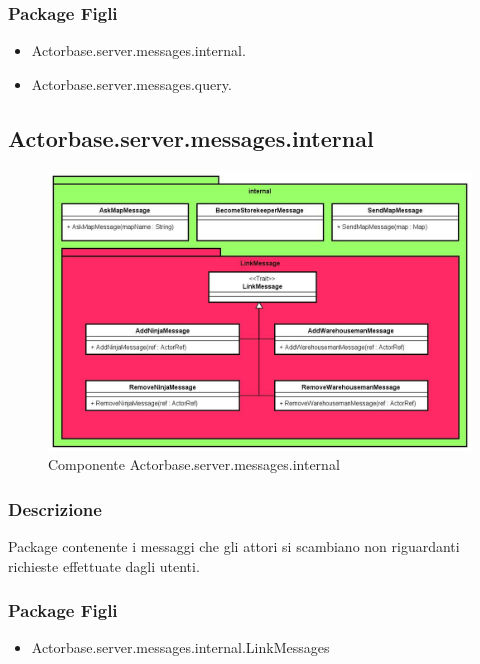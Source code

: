 \documentclass[a4paper]{article}
\begin{document}
			\subsubsection{Package Figli}
				\begin{itemize}
					\item Actorbase.server.messages.internal.
					\item Actorbase.server.messages.query.
				\end{itemize}
				
		\subsection{Actorbase.server.messages.internal}
		
			\begin{figure} [H]
				\centering
				\includegraphics[width=\textwidth]{ST/Server/internalLevel.jpg}
				\caption{Componente Actorbase.server.messages.internal}
			\end{figure}
			
			\subsubsection{Descrizione}
				Package contenente i messaggi che gli attori si scambiano non riguardanti richieste effettuate dagli utenti.
				
			\subsubsection{Package Figli}
				\begin{itemize}
					\item Actorbase.server.messages.internal.LinkMessages
				\end{itemize}
				
\end{document}

